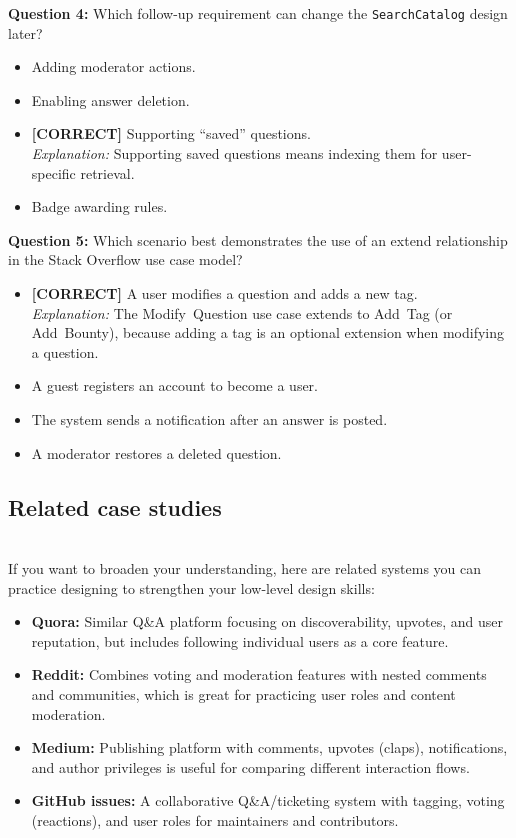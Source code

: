 \noindent
\textbf{Question 4:} Which follow-up requirement can change the \texttt{SearchCatalog} design later?
\\[0.2cm]
\begin{itemize}
 \item Adding moderator actions.
 \item Enabling answer deletion.
 \item \textbf{[CORRECT]} Supporting ``saved'' questions.
\\[0.1cm]
\textit{Explanation:} 
Supporting saved questions means indexing them for user-specific retrieval.
 \item Badge awarding rules.
\end{itemize}
\vspace{0.3cm}
\noindent
\textbf{Question 5:} Which scenario best demonstrates the use of an extend relationship in the Stack Overflow use case model?
\\[0.2cm]
\begin{itemize}
 \item \textbf{[CORRECT]} A user modifies a question and adds a new tag.
\\[0.1cm]
\textit{Explanation:} 
The Modify\ Question use case extends to Add\ Tag (or Add\ Bounty), because adding a tag is an optional extension when modifying a question.
 \item A guest registers an account to become a user.
 \item The system sends a notification after an answer is posted.
 \item A moderator restores a deleted question.
\end{itemize}

\subsection{Related case studies}\label{-u7cKp7p46yfqemZNrN9z}
\\
If you want to broaden your understanding, here are related systems you can practice designing to strengthen your low-level design skills:

\begin{itemize}
\item
\protect{}\label{2Uz1VMHy0bWnfzXq8ykZa}
\textbf{Quora:} Similar Q\&A platform focusing on discoverability, upvotes, and user reputation, but includes following individual users as a core feature.
\item
\protect{}\label{zsiBElAG-BWUp-Io-JwuQ}
\textbf{Reddit:} Combines voting and moderation features with nested comments and communities, which is great for practicing user roles and content moderation.
\item
\protect{}\label{F7Y6-1zxhCllh_4wWCl3R}
\textbf{Medium:} Publishing platform with comments, upvotes (claps), notifications, and author privileges is useful for comparing different interaction flows.
\item
\protect{}\label{YGymfVzqIYnUVcfxQ0loh}
\textbf{GitHub issues:} A collaborative Q\&A/ticketing system with tagging, voting (reactions), and user roles for maintainers and contributors.
\end{itemize}


